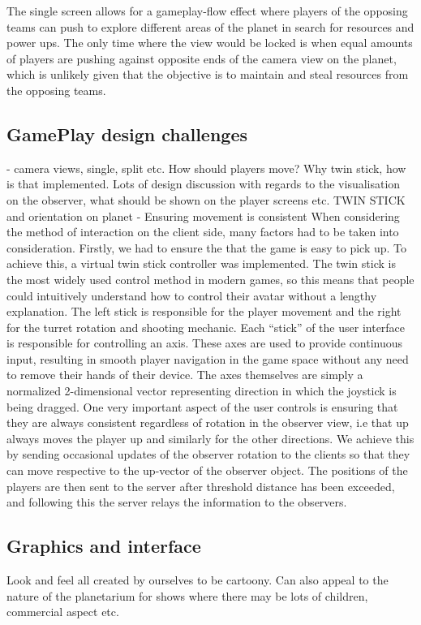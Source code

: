 \documentclass[11pt,a4paper]{article}
\begin{document}
    The single screen allows for a gameplay-flow effect where players of the opposing teams can push to explore different areas of the planet in search for resources and power ups. The only time where the view would be locked is when equal amounts of players are pushing against opposite ends of the camera view on the planet, which is unlikely given that the objective is to maintain and steal resources from the opposing teams.

     \pagebreak
     \subsection{GamePlay design challenges}
      - camera views, single, split etc. How should players move? Why twin stick, how is that implemented. Lots of design discussion with regards to the visualisation on the observer, what should be shown on the player screens etc.
      TWIN STICK and orientation on planet
       - Ensuring movement is consistent
       When considering the method of interaction on the client side, many factors had to be taken into consideration. Firstly, we had to ensure the that the game is easy to pick up. To achieve this, a virtual twin stick controller was implemented. The twin stick is the most widely used control method in modern games, so this means that people could intuitively understand how to control their avatar without a lengthy explanation. The left stick is responsible for the player movement and the right for the turret rotation and shooting mechanic. 
       Each “stick” of the user interface is responsible for controlling an axis. These axes are used to provide continuous input, resulting in smooth player navigation in the game space without any need to remove their hands of their device. The axes themselves are simply a normalized 2-dimensional vector representing direction in which the joystick is being dragged.
       One very important aspect of the user controls is ensuring that they are always consistent regardless of rotation in the observer view, i.e that up always moves the player up and similarly for the other directions. We achieve this by sending occasional updates of the observer rotation to the clients so that they can move respective to the up-vector of the observer object. The positions of the players are then sent to the server after threshold distance has been exceeded, and following this the server relays the information to the observers.

       \pagebreak
       \subsection{Graphics and interface}
       Look and feel all created by ourselves to be cartoony.
        Can also appeal to the nature of the planetarium for shows where there may be lots of children, commercial aspect etc.
\end{document}
